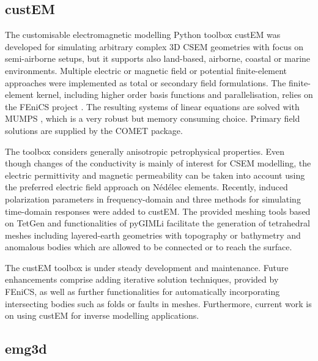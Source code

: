 \documentclass[
    paper,
  ]{geophysics}
\begin{document}
\subsection{custEM}

The customisable electromagnetic modelling Python toolbox custEM was developed
for simulating arbitrary complex 3D CSEM geometries with focus on semi-airborne
setups, but it supports also land-based, airborne, coastal  or marine
environments. Multiple electric or magnetic field or potential finite-element
approaches were implemented as total or secondary field formulations. The
finite-element kernel, including higher order basis functions and
parallelisation, relies on the FEniCS project \citep{B.SPR.12.Logg,
B.SPR.16.Langtangen}. The resulting systems of linear equations are solved with
MUMPS \citep{SIAM.01.Amestoy}, which is a very robust but memory consuming
choice. Primary field solutions are supplied by the COMET \citep{GEO.20.Skibbe}
package.

The toolbox considers generally anisotropic petrophysical properties. Even
though changes of the conductivity is mainly of interest for CSEM modelling, the
electric permittivity and magnetic permeability can be taken into account using
the preferred electric field approach on Nédélec elements. Recently, induced
polarization parameters in frequency-domain and three methods for simulating
time-domain responses were added to custEM. The provided meshing tools based on
TetGen \citep{TOM.15.Si} and functionalities of pyGIMLi \citep{CAG.17.Rucker}
facilitate the generation of tetrahedral meshes including layered-earth
geometries with topography or bathymetry and anomalous bodies which are allowed
to be connected or to reach the surface.

The custEM toolbox is under steady development and maintenance. Future
enhancements comprise adding iterative solution techniques, provided by FEniCS,
as well as further functionalities for automatically incorporating intersecting
bodies such as folds or faults in meshes. Furthermore, current work is on using
custEM for inverse modelling applications.


\subsection{emg3d}
\end{document}
